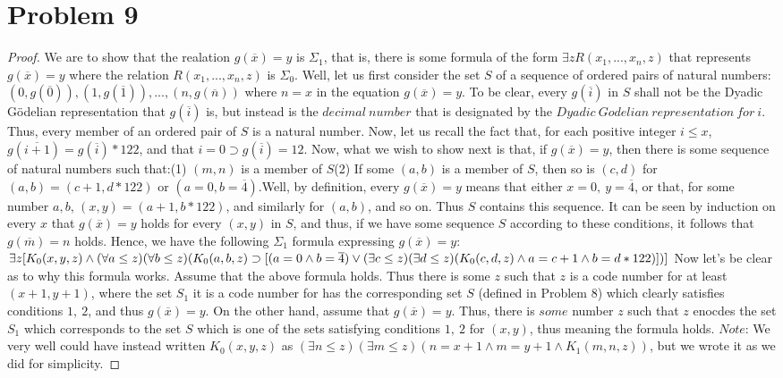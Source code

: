 \documentclass{article}
\theoremstyle{definition}
\begin{document}
\section*{Problem 9}
\begin{proof}
We are to show that the realation $g(\overline x)=y$ is $\Sigma_1$, that is, there is some formula of the form $\exists zR(x_1,...,x_n,z)$ that represents 
$g(\overline x)=y$ where the relation $R(x_1,...,x_n,z)$ is $\Sigma_0$. Well, let us first consider the set $S$ of a sequence of ordered pairs of natural 
numbers:\newline $(0,g(\overline 0)),(1,g(\overline 1)),...,(n,g(\overline n))$\newline
where $n=x$ in the equation $g(\overline x)=y$. To be clear, every $g(\overline i)$ in $S$ shall not be the Dyadic Gödelian representation that
 $g(\overline i)$ is, but instead is the $decimal\ number$ that is designated by the $Dyadic\  Godelian\  representation\  for\  i$. Thus, 
every member of an ordered pair of $S$ is a natural number. 
  Now, let us recall the fact that, for each positive integer 
$i\le x$, $g(\overline{i+1})=g(\overline i)*122$, and that $i=0\supset g(\overline i)=12$. Now, what we wish to show next is that, if $g(\overline x)=y$, 
then there is some sequence of natural numbers such that:\newline (1) $(m,n)$ is a member of $S$\newline (2) If some $(a,b)$ is a member of $S$, then so is 
$(c,d)$ for $(a,b)=(c+1,d*122)$ or $(a=0, b=\overline 4)$.\newline Well, by definition, every $g(\overline x)=y$ means that either $x=0,\ y=\overline 4$,
 or that, for some number $a, b$, $(x,y)=(a+1,b*122)$, and similarly for $(a,b)$, and so on. Thus $S$ contains this sequence. It can be seen by induction 
on every $x$
 that $g(\overline x)=y$ holds for every $(x,y)$ in $S$, and thus, if we have some sequence $S$ according to these conditions, it follows that 
 $g(\overline m)=n$ holds. Hence, we have the following $\Sigma_1$ formula expressing $g(\overline x)=y$:\newline
$\exists z[K_0(x,y,z)\wedge (\forall a\le z)(\forall b\le z)(K_0(a,b,z) \supset\newline [(a=0\wedge b=\overline 4)\newline \vee
(\exists c\le z)(\exists d\le z)(K_0(c,d,z)\wedge a=c+1\wedge b=d*122)])]$\newline
Now let's be clear as to why this formula works. Assume that the above formula holds. Thus there is some $z$ such that $z$ is a code number for at least 
$(x+1,y+1)$, where the set $S_1$ it is a code number for has the corresponding set $S$ (defined in Problem 8) which clearly satisfies conditions $1,\ 2$, and 
thus $g(\overline x)=y$. On the other hand, assume that $g(\overline x)=y$. Thus, there is $some$ number $z$ such that $z$ enocdes the set $S_1$ which 
corresponds to the set $S$ which is one of the sets satisfying conditions $1,\ 2$ for $(x,y)$, thus meaning the formula holds. $Note$: We very well could 
have instead written $K_0(x,y,z)$ as $(\exists n\le z)(\exists m\le z)(n=x+1\wedge m=y+1\wedge K_1(m,n,z))$, but we wrote it as we did for simplicity.
\end{proof}
\end{document}
